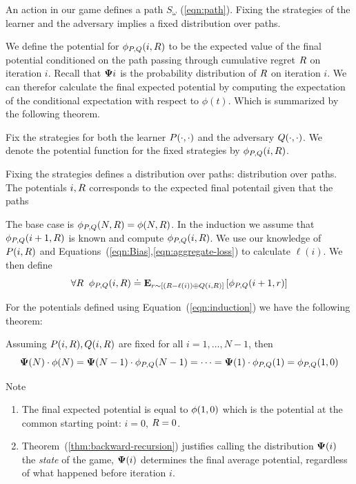 \documentclass{article}[12pt]
\begin{document}
An action in our game defines a path $S_\omega$
(\ref{eqn:path}). Fixing the strategies of the learner and the
adversary implies a fixed distribution over paths.

We define the potential for $\phi_{P,Q}(i,R)$ to be the expected value of
the final potential conditioned on the path passing through cumulative
regret $R$ on iteration $i$. Recall that ${\bf \Psi}{i}$ is the
probability distribution of $R$ on iteration $i$. We can therefor
calculate the final expected potential by computing the expectation of
the conditional expectation with respect to $\phi(t)$. Which is
summarized by the following theorem.

Fix the strategies for both the learner $P(\cdot,\cdot)$ and
the adversary $Q(\cdot,\cdot)$. We denote the potential
function for the fixed strategies by $\phi_{P,Q}(i,R)$.

Fixing the strategies defines a distribution over paths:
distribution over paths. The potentials $i,R$ corresponds to the
expected final potentail given that the paths 

The base case is  $\phi_{P,Q}(N,R) = \phi(N,R)$.
In the induction we assume that  $\phi_{P,Q}(i+1,R)$ is known and compute  $\phi_{P,Q}(i,R)$.
We use our knowledge of $P(i,R)$ and
Equations~(\ref{eqn:Bias},\ref{eqn:aggregate-loss}) to calculate
$\ell(i)$. We then define 
\begin{equation} \label{eqn:induction}
  \forall R\;\;
  \phi_{P,Q}(i,R) \doteq {\bf E}_{r \sim [(R-\ell(i)) \oplus Q(i,R)]}\left[ \phi_{P,Q}(i+1,r) \right]
\end{equation}

For the potentials defined using Equation~(\ref{eqn:induction}) we have the
following theorem:

\begin{theorem} \label{thm:backward-recursion}
Assuming $ P(i,R), Q(i,R)$ are fixed for all
$i=1,\ldots,N-1$, then
\[
   {\bf \Psi}(N)\cdot \phi(N)=
   {\bf \Psi}(N-1)\cdot \phi_{P,Q}(N-1)= \cdots =
   {\bf \Psi}(1)\cdot \phi_{P,Q}(1)=\phi_{P,Q}(1,0)
  \]
\end{theorem}

Note
\begin{enumerate}
\item
  The final expected potential is equal to $\phi(1,0)$ which is the
  potential at the common starting point: $i=0$, $R=0$.
\item
  Theorem~(\ref{thm:backward-recursion}) justifies calling the
  distribution ${\bf \Psi}(i)$ the {\em state} of the game, ${\bf \Psi}(i)$
  determines the final average potential, regardless of what happened
  before iteration $i$.

\end{enumerate}
\end{document}
